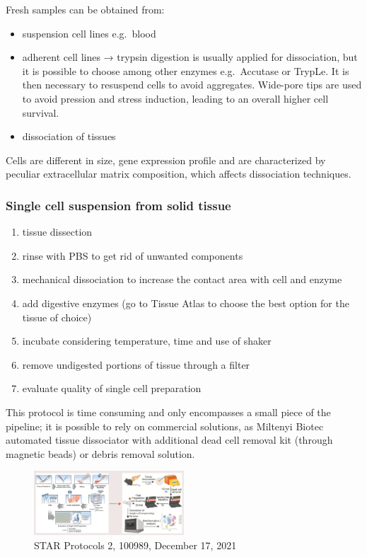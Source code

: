 Fresh samples can be obtained from:

\begin{itemize}
\tightlist
\item
  suspension cell lines e.g.~blood
\item
  adherent cell lines → trypsin digestion is usually applied for
  dissociation, but it is possible to choose among other enzymes
  e.g.~Accutase or TrypLe. It is then necessary to resuspend cells to
  avoid aggregates. Wide-pore tips are used to avoid pression and stress
  induction, leading to an overall higher cell survival.
\item
  dissociation of tissues
\end{itemize}

Cells are different in size, gene expression profile and are
characterized by peculiar extracellular matrix composition, which
affects dissociation techniques.

\hypertarget{single-cell-suspension-from-solid-tissue}{%
\subsubsection{Single cell suspension from solid
tissue}\label{single-cell-suspension-from-solid-tissue}}

\begin{enumerate}
\def\labelenumi{\arabic{enumi}.}
\tightlist
\item
  tissue dissection
\item
  rinse with PBS to get rid of unwanted components
\item
  mechanical dissociation to increase the contact area with cell and
  enzyme
\item
  add digestive enzymes (go to Tissue Atlas to choose the best option
  for the tissue of choice)
\item
  incubate considering temperature, time and use of shaker
\item
  remove undigested portions of tissue through a filter
\item
  evaluate quality of single cell preparation
\end{enumerate}

This protocol is time consuming and only encompasses a small piece of
the pipeline; it is possible to rely on commercial solutions, as
Miltenyi Biotec automated tissue dissociator with additional dead cell
removal kit (through magnetic beads) or debris removal solution.

\begin{figure}
\centering
\includegraphics[width=0.5\textwidth]{images/Screenshot_1.png}
\caption{STAR Protocols 2, 100989, December 17, 2021}
\end{figure}

